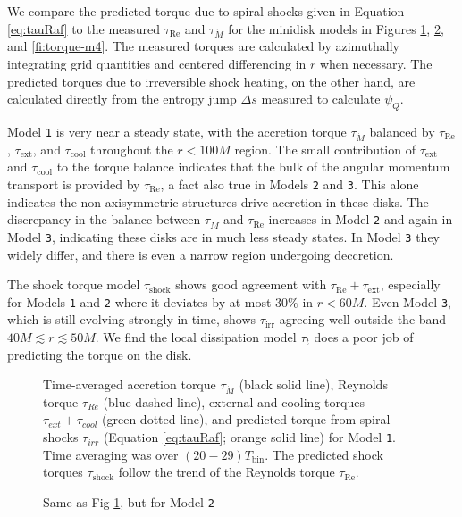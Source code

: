 \documentclass{emulateapj}
\newcommand{\De}{\Delta}
\newcommand{\model}[1]{{Model \texttt{#1}}}
\begin{document}
We compare the predicted torque due to spiral shocks given in Equation \eqref{eq:tauRaf} to the measured $\tau_\text{Re}$ and $\tau_{\dot{M}}$ for the minidisk models in Figures \ref{fi:torque-m2}, \ref{fi:torque-m3}, and \ref{fi:torque-m4}.  The measured torques are calculated by azimuthally integrating grid quantities and centered differencing in $r$ when necessary.  The predicted torques due to irreversible shock heating, on the other hand, are calculated directly from the entropy jump $\De s$ measured to calculate $\psi_Q$.  

\model{1} is very near a steady state, with the accretion torque $\tau_{\dot{M}}$ balanced by $\tau_\text{Re}$, $\tau_\text{ext}$, and $\tau_\text{cool}$ throughout the $r < 100M$ region.  The small contribution of $\tau_\text{ext}$ and $\tau_\text{cool}$ to the torque balance indicates that the bulk of the angular momentum transport is provided by $\tau_\text{Re}$, a fact also true in Models \texttt{2} and \texttt{3}.  This alone indicates the non-axisymmetric structures drive accretion in these disks.  The discrepancy in the balance between $\tau_{\dot{M}}$ and $\tau_\text{Re}$ increases in \model{2} and again in \model{3}, indicating these disks are in much less steady states.  In \model{3} they widely differ, and there is even a narrow region undergoing deccretion.  

The shock torque model $\tau_\text{shock}$ shows good agreement with $\tau_\text{Re}+\tau_\text{ext}$, especially for Models \texttt{1} and \texttt{2} where it deviates by at most $30\%$ in $r < 60M$.  Even \model{3}, which is still evolving strongly in time, shows $\tau_\text{irr}$ agreeing well outside the band $40M \lesssim r \lesssim 50M$.  We find the local dissipation model $\tau_t$ does a poor job of predicting the torque on the disk.

\begin{figure}
	\caption{\label{fi:torque-m2} Time-averaged accretion torque $\tau_{\dot{M}}$ (black solid line), Reynolds torque $\tau_{Re}$ (blue dashed line), external and cooling torques $\tau_{ext}+\tau_{cool}$ (green dotted line), and predicted torque from spiral shocks $\tau_{irr}$ (Equation \eqref{eq:tauRaf}; orange solid line) for \model{1}. Time averaging was over $(20-29)T_\text{bin}$.  The predicted shock torques $\tau_\text{shock}$ follow the trend of the Reynolds torque $\tau_\text{Re}$.}  
\end{figure}

\begin{figure}
	\caption{\label{fi:torque-m3} Same as Fig \ref{fi:torque-m2}, but for \model{2}}  
\end{figure}
\end{document}
